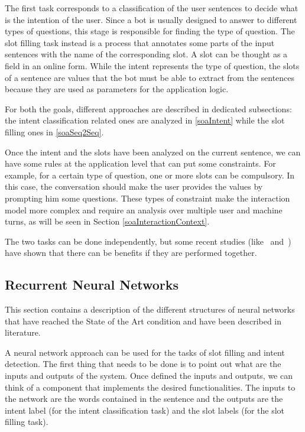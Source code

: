 The first task corresponds to a classification of the user sentences to decide what is the intention of the user. Since a bot is usually designed to answer to different types of questions, this stage is responsible for finding the type of question. The slot filling task instead is a process that annotates some parts of the input sentences with the name of the corresponding slot. A slot can be thought as a field in an online form. While the intent represents the type of question, the slots of a sentence are values that the bot must be able to extract from the sentences because they are used as parameters for the application logic.

For both the goals, different approaches are described in dedicated subsections: the intent classification related ones are analyzed in \ref{soaIntent} while the slot filling ones in \ref{soaSeq2Seq}.

Once the intent and the slots have been analyzed on the current sentence, we can have some rules at the application level that can put some constraints. For example, for a certain type of question, one or more slots can be compulsory. In this case, the conversation should make the user provides the values by prompting him some questions. These types of constraint make the interaction model more complex and require an analysis over multiple user and machine turns, as will be seen in Section \ref{soaInteractionContext}.

The two tasks can be done independently, but some recent studies (like~\cite{guo2014joint} and~\cite{liu2016attention}) have shown that there can be benefits if they are performed together.

\subsection{Recurrent Neural Networks}
This section contains a description of the different structures of neural networks that have reached the State of the Art condition and have been described in literature.

A neural network approach can be used for the tasks of slot filling and intent detection. The first thing that needs to be done is to point out what are the inputs and outputs of the system. Once defined the inputs and outputs, we can think of a component that implements the desired functionalities. The inputs to the network are the words contained in the sentence and the outputs are the intent label (for the intent classification task) and the slot labels (for the slot filling task).

